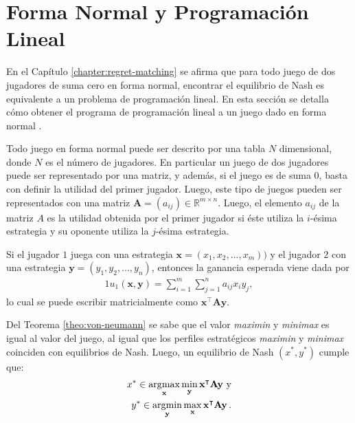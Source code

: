 \chapter{Forma Normal y Programación Lineal}
\label{apex:chapter:programacion-lineal}

En el Capítulo \ref{chapter:regret-matching} se afirma que para todo juego de dos jugadores de suma cero en forma normal, encontrar el equilibrio de Nash es equivalente a un problema de programación lineal. En esta sección se detalla cómo obtener el programa de programación lineal a un juego dado en forma normal \cite[pp.~228-233]{bib:pl-chvatal}.

Todo juego en forma normal puede ser descrito por una tabla $N$ dimensional, donde $N$ es el número de jugadores. En particular un juego de dos jugadores puede ser representado por una matriz, y además, si el juego es de suma $0$, basta con definir la utilidad del primer jugador. Luego, este tipo de juegos pueden ser representados con una matriz $\mathbf{A} = (a_{ij}) \in \mathbb{R}^{m \times n}$. Luego, el elemento $a_{ij}$ de la matriz $A$ es la utilidad obtenida por el primer jugador si éste utiliza la $i$-ésima estrategia y su oponente utiliza la $j$-ésima estrategia.

Si el jugador $1$ juega con una estrategia $ \mathbf{x} = (x_1, x_2, ..., x_m))$ y el jugador $2$ con una estrategia $\mathbf{y} = (y_1, y_2, ..., y_n)$, entonces la ganancia esperada viene dada por
\begin{alignat}{1}
u_1(\mathbf{x}, \mathbf{y}) = \sum_{i = 1}^m \sum_{j = 1}^n a_{ij}x_iy_j,
\end{alignat}
lo cual se puede escribir matricialmente como $\mathbf{x}^\intercal \mathbf{A} \mathbf{y}$.

Del Teorema \ref{theo:von-neumann} se sabe que el valor \textit{maximin} y \textit{minimax} es igual al valor del juego, al igual que los perfiles estratégicos \textit{maximin} y \textit{minimax} coinciden con equilibrios de Nash. Luego, un equilibrio de Nash $(x^*, y^*)$ cumple que:
\begin{alignat}{1}
x^* \in \operatorname*{\arg\!\max}_{\mathbf{x}}{\min_{\mathbf{y}}{\mathbf{x}^\intercal \mathbf{A} \mathbf{y}}} \ \text{y} \label{apex:eq:maximin} \\
y^* \in \operatorname*{\arg\!\min}_{\mathbf{y}}{\max_{\mathbf{x}}{\mathbf{x}^\intercal \mathbf{A} \mathbf{y}}} \,.
\label{apex:eq:minimax}
\end{alignat}

